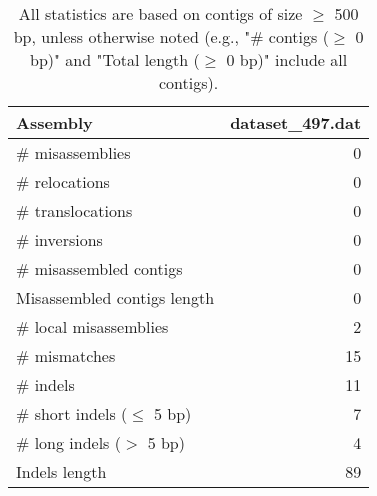 \documentclass[12pt,a4paper]{article}
\begin{document}
\begin{table}[ht]
\begin{center}
\caption{All statistics are based on contigs of size $\geq$ 500 bp, unless otherwise noted (e.g., "\# contigs ($\geq$ 0 bp)" and "Total length ($\geq$ 0 bp)" include all contigs).}
\begin{tabular}{|l*{1}{|r}|}
\hline
Assembly & dataset\_497.dat \\ \hline
\# misassemblies & 0 \\ \hline
\hspace{5mm}\# relocations & 0 \\ \hline
\hspace{5mm}\# translocations & 0 \\ \hline
\hspace{5mm}\# inversions & 0 \\ \hline
\# misassembled contigs & 0 \\ \hline
Misassembled contigs length & 0 \\ \hline
\# local misassemblies & 2 \\ \hline
\# mismatches & 15 \\ \hline
\# indels & 11 \\ \hline
\hspace{5mm}\# short indels ($\leq$ 5 bp) & 7 \\ \hline
\hspace{5mm}\# long indels ($>$ 5 bp) & 4 \\ \hline
Indels length & 89 \\ \hline
\end{tabular}
\end{center}
\end{table}
\end{document}
